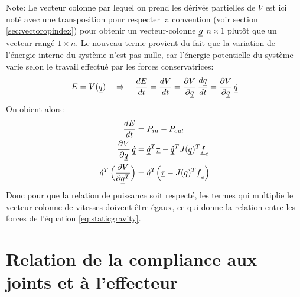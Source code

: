 Note: Le vecteur colonne par lequel on prend les dérivés partielles de $V$ est ici noté avec une transposition pour respecter la convention (voir section \ref{sec:vectoropindex}) pour obtenir un vecteur-colonne $\underline{g}$ $n \times 1$ plutôt que un vecteur-rangé $1 \times n$. Le nouveau terme provient du fait que la variation de l'énergie interne du système n'est pas nulle, car l'énergie potentielle du système varie selon le travail effectué par les forces conservatrices:
\begin{align}
E = V( \underline{q} ) \quad \Rightarrow \quad \frac{dE}{dt} = \frac{dV}{dt} = \frac{\partial V}{ \partial \underline{q}} \, \frac{d \underline{q}}{dt} = \frac{\partial V}{ \partial \underline{q}} \, \underline{\dot{q}}
\end{align}
On obient alors:
\begin{align}
\frac{dE}{dt} &= P_{in} - P_{out} \\
\frac{\partial V}{ \partial \underline{q}} \, \underline{\dot{q}} &=  \underline{\dot{q}}^T \underline{\tau} - \underline{\dot{q}}^T  J( \underline{q})^T \underline{f}_e  \\
\underline{\dot{q}}^T  \, \Big(  \frac{\partial V}{ \partial \underline{q}^T} \Big) &=  \underline{\dot{q}}^T  \Big(\underline{\tau} -  J( \underline{q})^T \underline{f}_e  \Big)
\end{align}
Donc pour que la relation de puissance soit respecté, les termes qui multiplie le vecteur-colonne de vitesses doivent être égaux, ce qui donne la relation entre les forces de l'équation \eqref{eq:staticgravity}.




\section{Relation de la compliance aux joints et à l'effecteur}
\label{sec:manipcompliance}

